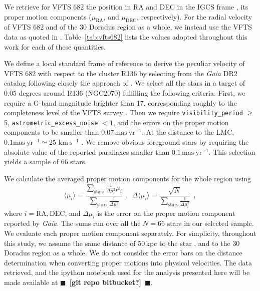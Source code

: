 \documentclass[apjl,twocolumn]{emulateapj}
\newcommand{\todo}[1]{{\large $\blacksquare$~\textbf{\color{red}[#1]}}~$\blacksquare$}
\newcommand{\kms}{{\,\mathrm{km\ s^{-1}}}}
\DeclareRobustCommand{\Tabref}[1]{Table~\ref{#1}}
\begin{document}
We retrieve for VFTS 682 the position in RA and DEC
in the IGCS frame \cite[][]{brown:18}, its
proper motion components ($\mu_\mathrm{RA}$, and $\mu_\mathrm{DEC}$,
respectively). For the radial velocity of VFTS 682 and of the 30 Doradus
region as a whole, we instead use the VFTS data
as quoted in \cite{bestenlehner:11}. \Tabref{tab:vfts682} lists the values adopted throughout
this work for each of these quantities.


We define a local standard frame of reference to derive the peculiar velocity
of VFTS 682 with respect to the cluster R136 by selecting from the \emph{Gaia} DR2 catalog following closely the approach of \cite{vandermarel:02,lennon:18}.
We select all the stars in a target of 0.05 degrees around R136
(NGC2070) fulfilling the following criteria. First, we require a G-band
magnitude brighter than 17, corresponding roughly to the
completeness level of the VFTS survey \citep[here we implicitly assume
G$\sim$V,][]{evans:11}. Then we require \texttt{visibility\_period} $\geq$ 5,
\texttt{astrometric\_excess\_noise} $< 1$, and the errors on the proper
motion components to be smaller than 0.07\,$\mathrm{mas\
  yr^{-1}}$. At the distance to the LMC, $0.1\mathrm{mas\
  yr^{-1}}\simeq25\,\kms$ \citep[e.g.,][]{platais:18}. We
remove obvious foreground stars by requiring the absolute value of
the reported parallaxes smaller than $0.1\,\mathrm{mas\ yr^{-1}}$.
This selection yields a sample of 66 stars.%

We calculate the averaged proper motion components for the whole
region using 
\begin{equation}
  \label{eq:mean}
  \langle \mu_i\rangle = \frac{\sum_\mathrm{stars}\frac{1}{\Delta
      \mu_i^2}\mu_i}{\sum_\mathrm{stars} \frac{1}{\Delta \mu_i^2}} \ \ , \
  \ \Delta \langle \mu_i\rangle = \frac{\sqrt{N}}{\sum_\mathrm{stars}
    \frac{1}{\Delta \mu_i^2}} \ \ ,
\end{equation}
where $i = \mathrm{RA}, \mathrm{DEC}$, and $\Delta \mu_i$ is the error
on the proper motion component reported by \emph{Gaia}. The sums run over
all the $N=66$ stars in our selected sample. We evaluate each proper motion
component separately. For simplicity, throughout this study, we assume the same
distance of $50$\,kpc to the star \citep[][]{pietrzynski:13}, and to
the 30 Doradus region as a whole. We do not consider the error bars on
the distance determination when converting proper motions into
physical velocities. The data retrieved, and the ipython notebook used for the analysis
presented here will be made available at \todo{git repo bitbucket?}. 
\end{document}
